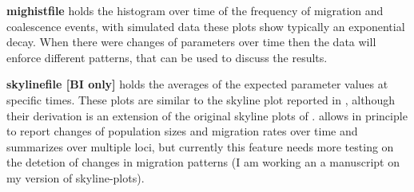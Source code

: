 \begin{description}
\item{\bf mighistfile} holds the histogram over time of the frequency of migration and coalescence events, with simulated data these plots show typically an exponential decay. When there were changes of parameters over time then the data will enforce different patterns, that can be used to discuss the results.

\item{\bf skylinefile [BI only]} holds the averages of the expected parameter values at specific times. These plots are similar to the skyline plot reported in \beast \citep{Drummond:2005:BCI}, although their derivation is an extension of the original skyline plots of \citep{strimmer:2001:EDH}. \migrate allows in principle to report changes of population sizes and migration rates over time and summarizes over multiple loci, but currently this feature needs more testing on the detetion of changes in migration patterns (I am working an a manuscript on  my version of skyline-plots).
\end{description}
